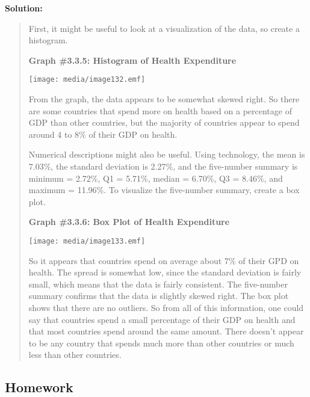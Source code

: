 \documentclass[]{book}
\begin{document}
\textbf{Solution:}

\begin{quote}
First, it might be useful to look at a visualization of the data, so
create a histogram.

\textbf{Graph \#3.3.5: Histogram of Health Expenditure}

\texttt{[image: media/image132.emf]}

From the graph, the data appears to be somewhat skewed right. So there
are some countries that spend more on health based on a percentage of
GDP than other countries, but the majority of countries appear to
spend around 4 to 8\% of their GDP on health.

Numerical descriptions might also be useful. Using technology, the
mean is 7.03\%, the standard deviation is 2.27\%, and the five-number
summary is minimum = 2.72\%, Q1 = 5.71\%, median = 6.70\%, Q3 = 8.46\%,
and maximum = 11.96\%. To visualize the five-number summary, create a
box plot.

\textbf{Graph \#3.3.6: Box Plot of Health Expenditure}

\texttt{[image: media/image133.emf]}

So it appears that countries spend on average about 7\% of their GPD on
health. The spread is somewhat low, since the standard deviation is
fairly small, which means that the data is fairly consistent. The
five-number summary confirms that the data is slightly skewed right.
The box plot shows that there are no outliers. So from all of this
information, one could say that countries spend a small percentage of
their GDP on health and that most countries spend around the same
amount. There doesn't appear to be any country that spends much more
than other countries or much less than other countries.
\end{quote}

\hypertarget{homework-9}{%
\subsection{Homework}\label{homework-9}}
\end{document}
